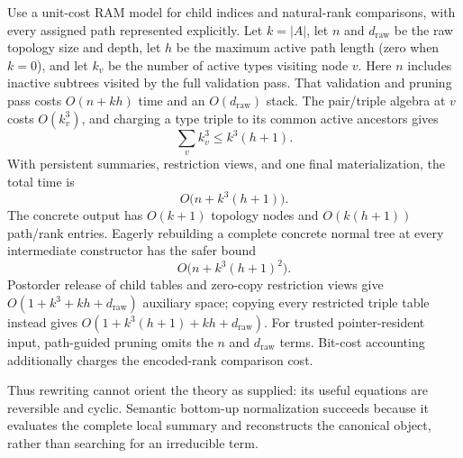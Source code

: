 Use a unit-cost RAM model for child indices and natural-rank comparisons, with
every assigned path represented explicitly.  Let \(k=|A|\), let \(n\) and
\(d_{\mathrm{raw}}\) be the raw topology size and depth, let \(h\) be the
maximum active path length (zero when \(k=0\)), and let \(k_v\) be the number
of active types visiting node \(v\).  Here \(n\) includes inactive subtrees
visited by the full validation pass.  That validation and pruning pass costs
\(O(n+kh)\) time and an
\(O(d_{\mathrm{raw}})\) stack.  The pair/triple algebra at \(v\) costs
\(O(k_v^3)\), and charging a type triple to its common active ancestors gives
\begin{equation}
 \sum_v k_v^3\le k^3(h+1).
 \label{eq:bottom-up-triple-cost}
\end{equation}
With persistent summaries, restriction views, and one final materialization,
the total time is
\begin{equation}
 O\bigl(n+k^3(h+1)\bigr).
 \label{eq:bottom-up-lazy-cost}
\end{equation}
The concrete output has \(O(k+1)\) topology nodes and
\(O(k(h+1))\) path/rank entries.  Eagerly rebuilding a complete concrete
normal tree at every intermediate constructor has the safer bound
\begin{equation}
 O\bigl(n+k^3(h+1)^2\bigr).
 \label{eq:bottom-up-eager-cost}
\end{equation}
Postorder release of child tables and zero-copy restriction views give
\(O(1+k^3+kh+d_{\mathrm{raw}})\) auxiliary space; copying every restricted
triple table instead gives
\(O(1+k^3(h+1)+kh+d_{\mathrm{raw}})\).  For trusted pointer-resident input,
path-guided pruning omits the \(n\) and \(d_{\mathrm{raw}}\) terms.  Bit-cost
accounting additionally charges the encoded-rank comparison cost.

Thus rewriting cannot orient the theory as supplied: its useful equations
are reversible and cyclic.  Semantic bottom-up normalization succeeds because
it evaluates the complete local summary and reconstructs the canonical object,
rather than searching for an irreducible term.
